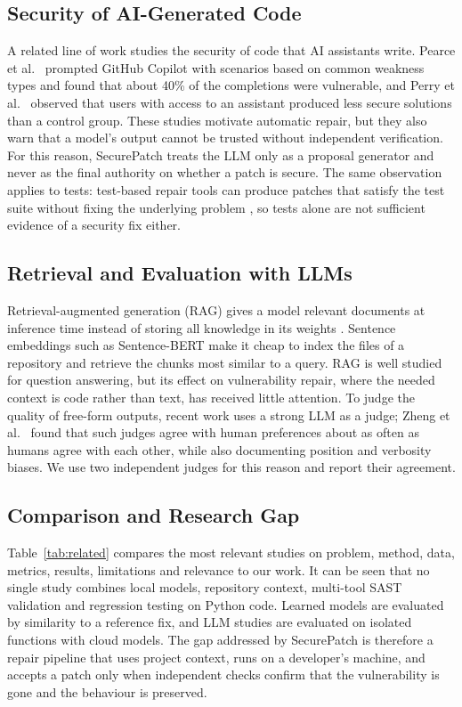\documentclass[12pt,onecolumn,draftclsnofoot]{IEEEtran}
\begin{document}
\subsection{Security of AI-Generated Code}
A related line of work studies the security of code that AI assistants write. Pearce et al.\ \cite{pearce2022asleep} prompted GitHub Copilot with scenarios based on common weakness types and found that about 40\% of the completions were vulnerable, and Perry et al.\ \cite{perry2023users} observed that users with access to an assistant produced less secure solutions than a control group. These studies motivate automatic repair, but they also warn that a model's output cannot be trusted without independent verification. For this reason, SecurePatch treats the LLM only as a proposal generator and never as the final authority on whether a patch is secure. The same observation applies to tests: test-based repair tools can produce patches that satisfy the test suite without fixing the underlying problem \cite{legoues2019apr}, so tests alone are not sufficient evidence of a security fix either.

\subsection{Retrieval and Evaluation with LLMs}
Retrieval-augmented generation (RAG) gives a model relevant documents at inference time instead of storing all knowledge in its weights \cite{lewis2020rag, gao2023ragsurvey}. Sentence embeddings such as Sentence-BERT \cite{reimers2019sbert} make it cheap to index the files of a repository and retrieve the chunks most similar to a query. RAG is well studied for question answering, but its effect on vulnerability repair, where the needed context is code rather than text, has received little attention. To judge the quality of free-form outputs, recent work uses a strong LLM as a judge; Zheng et al.\ \cite{zheng2023judge} found that such judges agree with human preferences about as often as humans agree with each other, while also documenting position and verbosity biases. We use two independent judges for this reason and report their agreement.

\subsection{Comparison and Research Gap}
Table~\ref{tab:related} compares the most relevant studies on problem, method, data, metrics, results, limitations and relevance to our work. It can be seen that no single study combines local models, repository context, multi-tool SAST validation and regression testing on Python code. Learned models are evaluated by similarity to a reference fix, and LLM studies are evaluated on isolated functions with cloud models. The gap addressed by SecurePatch is therefore a repair pipeline that uses project context, runs on a developer's machine, and accepts a patch only when independent checks confirm that the vulnerability is gone and the behaviour is preserved.
\end{document}
